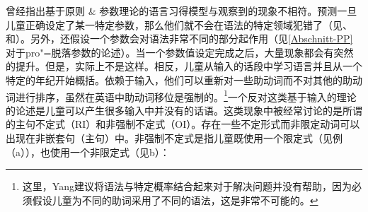  \citet{Tomasello2000a,Tomasello2003a}曾经指出基于原则 \& 参数理论的语言习得模型与观察到的现象不相符。\pptc 预测一旦儿童正确设定了某一特定参数，那么他们就不会在语法的特定领域犯错了（见\citealp[]{Chomsky86}、\citealp[--22]{Radford90a-u}和\citealp[]{Lightfoot97a}）。另外，还假设一个参数会对语法非常不同的部分起作用（见\ref{Abschnitt-PP}对于pro"=脱落参数的论述）。当一个参数值设定完成之后，大量现象都会有突然的提升\citep[]{Lightfoot97a}。但是，实际上不是这样。相反，儿童从输入的话段中学习语言并且从一个特定的年纪开始概括。依赖于输入，他们可以重新对一些助动词而不对其他的助动词进行排序，虽然在英语中助动词移位是强制的。\footnote{%
这里，Yang建议将语法与特定概率结合起来对于解决问题并没有帮助，因为必须假设儿童为不同的助词采用了不同的语法，这是非常不可能的。
}一个反对这类基于输入的理论的论述是儿童可以产生很多输入中并没有的话语。这类现象中被经常讨论的是所谓的主句不定式（RI）和非强制不定式（OI）\citep{Wexler98a}。存在一些不定形式而非限定动词可以出现在非嵌套句（主句）中。非强制不定式是指儿童既使用一个限定式（见例 （a）），也使用一个非限定式（见b）\citep[]{Wexler98a}：
